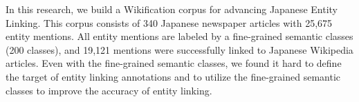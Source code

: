 In this research, we build a Wikification corpus for advancing Japanese Entity Linking. This corpus consists of 340 Japanese newspaper articles with 25,675 entity mentions. All entity mentions are labeled by a fine-grained semantic classes (200 classes), and 19,121 mentions were successfully linked to Japanese Wikipedia articles. Even with the fine-grained semantic classes, we found it hard to define the target of entity linking annotations and to utilize the fine-grained semantic classes to improve the accuracy of entity linking.

